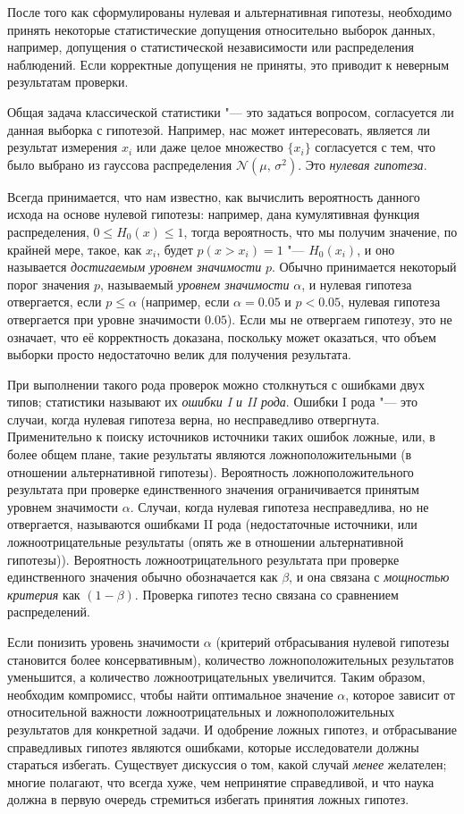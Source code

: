 После того как сформулированы нулевая и альтернативная гипотезы, необходимо принять некоторые статистические допущения 
относительно выборок данных, например, допущения о статистической независимости или распределения наблюдений. Если 
корректные допущения не приняты, это приводит к неверным результатам проверки.

Общая задача классической статистики "--- это задаться вопросом, согласуется ли данная выборка с гипотезой. Например, 
нас может интересовать, является ли результат измерения $x_i$ или даже целое множество $\{x_i\}$ согласуется с тем, 
что было выбрано из гауссова распределения $\mathcal{N}(\mu,\,\sigma^{2})$. Это \textit{нулевая гипотеза}.

Всегда принимается, что нам известно, как вычислить вероятность данного исхода на основе нулевой гипотезы: например, 
дана кумулятивная функция распределения, $0 \leq H_0(x) \leq 1$, тогда вероятность, что мы получим значение, 
по крайней мере, такое, как $x_i$, будет $p(x > x_i) = 1 $ "--- $H_0(x_i)$, и оно называется 
\textit{достигаемым уровнем значимости} $p$. Обычно принимается некоторый порог значения $p$, 
называемый \textit{уровнем значимости} $\alpha$, и нулевая гипотеза отвергается, если $p \leq \alpha $ 
(например, если $\alpha = 0.05$ и $p < 0.05$, нулевая гипотеза отвергается при уровне значимости $0.05$). 
Если мы не отвергаем гипотезу, это не означает, что её корректность доказана, поскольку может оказаться, что объем 
выборки просто недостаточно велик для получения результата.

При выполнении такого рода проверок можно столкнуться с ошибками двух типов; статистики называют их 
\textit{ошибки I и II рода}. Ошибки I рода "--- это случаи, когда нулевая гипотеза верна, но несправедливо 
отвергнута. Применительно к поиску источников источники таких ошибок ложные, или, в более общем плане, такие 
результаты являются ложноположительными (в отношении альтернативной гипотезы). Вероятность ложноположительного 
результата при проверке единственного значения ограничивается принятым уровнем значимости $\alpha$. Случаи, когда 
нулевая гипотеза несправедлива, но не отвергается, называются ошибками II рода (недостаточные источники, или 
ложноотрицательные результаты (опять же в отношении альтернативной гипотезы)). Вероятность ложноотрицательного 
результата при проверке единственного значения обычно обозначается как $\beta$, и она связана с 
\textit{мощностью критерия} как $(1-\beta)$. Проверка гипотез тесно связана со сравнением распределений.

Если понизить уровень значимости $\alpha$ (критерий отбрасывания нулевой гипотезы становится более консервативным), 
количество ложноположительных результатов уменьшится, а количество ложноотрицательных увеличится. Таким образом, 
необходим компромисс, чтобы найти оптимальное значение $\alpha$, которое зависит от относительной важности 
ложноотрицательных и ложноположительных результатов для конкретной задачи. И одобрение ложных гипотез, и отбрасывание 
справедливых гипотез являются ошибками, которые исследователи должны стараться избегать. Существует дискуссия о том, 
какой случай \textit{менее} желателен; многие полагают, что всегда хуже, чем непринятие справедливой, и что наука 
должна в первую очередь стремиться избегать принятия ложных гипотез.

